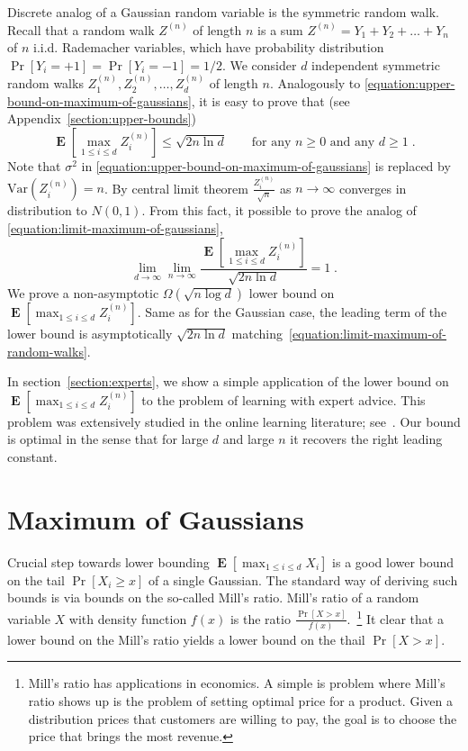 \documentclass{article}
\DeclareMathOperator*{\Exp}{\mathbf{E}}
\newcommand{\Var}{\mathrm{Var}}
\begin{document}
Discrete analog of a Gaussian random variable is the symmetric random walk.
Recall that a random walk $Z^{(n)}$ of length $n$ is a sum $Z^{(n)} = Y_1 + Y_2
+ \dots + Y_n$ of $n$ i.i.d. Rademacher variables, which have probability
distribution $\Pr[Y_i = +1] = \Pr[Y_i = -1] = 1/2$. We consider $d$ independent
symmetric random walks $Z^{(n)}_1, Z^{(n)}_2, \dots, Z^{(n)}_d$ of length $n$.
Analogously to \eqref{equation:upper-bound-on-maximum-of-gaussians}, it is easy
to prove that (see Appendix~\ref{section:upper-bounds})
\begin{equation}
\label{equation:upper-bound-on-maximum-of-random-walks}
\Exp \left[ \max_{1 \le i \le d} Z^{(n)}_i \right] \le \sqrt{2 n \ln d} \qquad \text{for any $n \ge 0$ and any $d \ge 1$}\; .
\end{equation}
Note that $\sigma^2$ in \eqref{equation:upper-bound-on-maximum-of-gaussians} is
replaced by $\Var(Z^{(n)}_i) = n$. By central limit theorem
$\frac{Z^{(n)}_i}{\sqrt{n}}$ as $n \to \infty$ converges in distribution to
$N(0,1)$. From this fact, it possible to prove the analog of
\eqref{equation:limit-maximum-of-gaussians},
\begin{equation}
\label{equation:limit-maximum-of-random-walks}
\lim_{d \to \infty} \lim_{n \to \infty} \frac{\Exp\left[ \max_{1 \le i \le d} Z^{(n)}_i \right]}{\sqrt{2 n \ln d}} = 1 \; .
\end{equation}
We prove a non-asymptotic $\Omega(\sqrt{n \log d})$ lower bound on $\Exp\left[
\max_{1 \le i \le d} Z^{(n)}_i \right]$.  Same as for the Gaussian case, the
leading term of the lower bound is asymptotically $\sqrt{2 n \ln d}$
matching~\eqref{equation:limit-maximum-of-random-walks}.

In section~\ref{section:experts}, we show a simple application of the lower
bound on $\Exp\left[\max_{1 \le i \le d} Z^{(n)}_i \right]$ to the problem of
learning with expert advice.  This problem was extensively studied in the
online learning literature; see~\citep{Cesa-BianchiL06}.  Our bound is optimal
in the sense that for large $d$ and large $n$ it recovers the right leading
constant.

\section{Maximum of Gaussians}
\label{section:maximum-of-gaussians}

Crucial step towards lower bounding $\Exp \left[ \max_{1 \le i \le d} X_i
\right]$ is a good lower bound on the tail $\Pr[X_i \ge x]$ of a single
Gaussian. The standard way of deriving such bounds is via bounds on the so-called
Mill's ratio.  Mill's ratio of a random variable $X$ with density function
$f(x)$ is the ratio $\frac{\Pr[X > x]}{f(x)}$.~\footnote{Mill's ratio has
applications in economics. A simple is problem where Mill's ratio shows up is
the problem of setting optimal price for a product.  Given a distribution
prices that customers are willing to pay, the goal is to choose the price that
brings the most revenue.} It clear that a lower bound on the Mill's ratio
yields a lower bound on the thail $\Pr[X > x]$.
\end{document}
